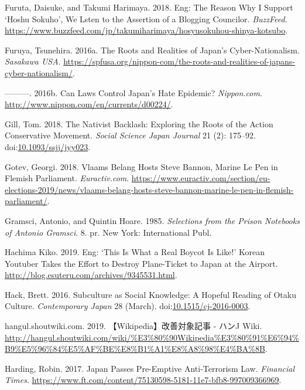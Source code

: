 \documentclass[10pt,british,A4paper,,openany]{memoir}
\begin{document}
\hypertarget{ref-furuta_eng:_2018}{}
Furuta, Daisuke, and Takumi Harimaya. 2018. Eng: The Reason Why I
Support `Hoshu Sokuho', We Lsten to the Assertion of a Blogging
Councilor. \emph{BuzzFeed}.
\url{https://www.buzzfeed.com/jp/takumiharimaya/hosyusokuhou-shinya-kotsubo}.

\hypertarget{ref-furuya_roots_2016}{}
Furuya, Tsunehira. 2016a. The Roots and Realities of Japan's
Cyber-Nationalism. \emph{Sasakawa USA}.
\url{https://spfusa.org/nippon-com/the-roots-and-realities-of-japans-cyber-nationalism/}.

\hypertarget{ref-furuya_can_2016}{}
---------. 2016b. Can Laws Control Japan's Hate Epidemic?
\emph{Nippon.com}. \url{http://www.nippon.com/en/currents/d00224/}.

\hypertarget{ref-gill_nativist_2018}{}
Gill, Tom. 2018. The Nativist Backlash: Exploring the Roots of the
Action Conservative Movement. \emph{Social Science Japan Journal} 21
(2): 175--92.
doi:\href{https://doi.org/10.1093/ssjj/jyy023}{10.1093/ssjj/jyy023}.

\hypertarget{ref-gotev_vlaams_2018}{}
Gotev, Georgi. 2018. Vlaams Belang Hosts Steve Bannon, Marine Le Pen in
Flemish Parliament. \emph{Euractiv.com}.
\url{https://www.euractiv.com/section/eu-elections-2019/news/vlaams-belang-hosts-steve-bannon-marine-le-pen-in-flemish-parliament/}.

\hypertarget{ref-gramsci_selections_1985}{}
Gramsci, Antonio, and Quintin Hoare. 1985. \emph{Selections from the
Prison Notebooks of Antonio Gramsci}. 8. pr. New York: International
Publ.

\hypertarget{ref-hachima_kiko_eng:_2019}{}
Hachima Kiko. 2019. Eng: `This Is What a Real Boycot Is Like!' Korean
Youtuber Takes the Effort to Destroy Plane-Ticket to Japan at the
Airport. \url{http://blog.esuteru.com/archives/9345531.html}.

\hypertarget{ref-hack_subculture_2016}{}
Hack, Brett. 2016. Subculture as Social Knowledge: A Hopeful Reading of
Otaku Culture. \emph{Contemporary Japan} 28 (March).
doi:\href{https://doi.org/10.1515/cj-2016-0003}{10.1515/cj-2016-0003}.

\hypertarget{ref-hangul.shoutwiki.com_wikipedia_2019}{}
hangul.shoutwiki.com. 2019. 【Wikipedia】改善対象記事 - ハンJ Wiki.
\url{http://hangul.shoutwiki.com/wiki/\%E3\%80\%90Wikipedia\%E3\%80\%91\%E6\%94\%B9\%E5\%96\%84\%E5\%AF\%BE\%E8\%B1\%A1\%E8\%A8\%98\%E4\%BA\%8B}.

\hypertarget{ref-harding_japan_2017}{}
Harding, Robin. 2017. Japan Passes Pre-Emptive Anti-Terrorism Law.
\emph{Financial Times}.
\url{https://www.ft.com/content/75130598-5181-11e7-bfb8-997009366969}.
\end{document}
